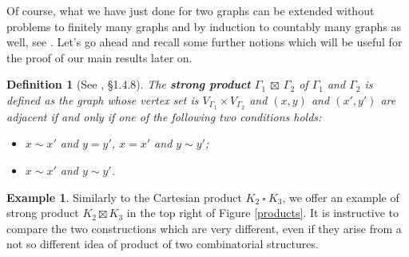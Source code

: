 \documentclass{amsart}
\newtheorem{defn}[theo]{Definition}
\theoremstyle{definition}
\newtheorem{example}[theo]{Example}
\numberwithin{equation}{section}
\begin{document}
Of course, what we have just done for two graphs can be extended without problems to finitely many graphs and by induction to countably many graphs as well, see \cite{spectrabook, crs}. Let's go ahead and recall some further notions which will be useful for the proof of our main results later on.
\begin{defn}[See \cite{spectrabook}, \S 1.4.8]\label{sproduct}
The \textbf{strong product} $\Gamma_1  \ \boxtimes \ \Gamma_2$ of $\Gamma_1$ and $\Gamma_2$ is defined as the graph whose vertex set is $V_{\Gamma_1} \times V_{\Gamma_2}$ and $(x,y)$ and $(x',y')$ are adjacent if and only if one of the following two conditions holds: \begin{itemize}
    \item[(1).] $x \sim x'$ and $y=y'$, $x=x'$ and $y\sim y'$;
\item[(2).] $x \sim x'$ and $y \sim y'$.
\end{itemize} 
\end{defn}

\begin{example}Similarly to the Cartesian product $K_2  \ \square \ K_3$, we offer an example of strong product  $K_2 \boxtimes K_3$ in the top right of Figure \ref{products}. It is instructive to compare the two constructions which are very different, even if they arise from a not so different idea of product of two combinatorial structures. \end{example}
\end{document}

